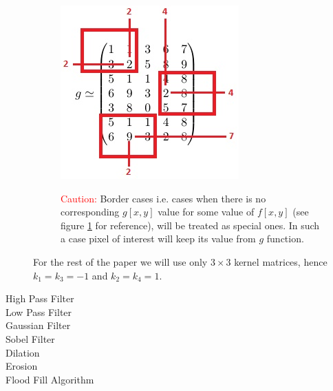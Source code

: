 \documentclass{article}
\begin{document}
\begin{description}
\begin{figure}
\noindent
\begin{minipage}{0.3\textwidth}%
	\includegraphics[width=\linewidth]{_Figures/conv_filter_border.jpg} 
	\caption{}
	\label{fig:caution}
\end{minipage}%
\hfill%
\begin{minipage}{0.6\textwidth}\raggedleft
\textcolor{red}{Caution:} Border cases i.e. cases when there is no corresponding $g[x,y]$ value for some value of $f[x,y]$ (see figure \ref{fig:caution} for reference), will be treated as special ones. In such a case pixel of interest will keep its value from $g$ function.
\end{minipage}
\end{figure}

For the rest of the paper we will use only $3 \times 3$ kernel matrices, hence $k_1 = k_3 = -1$ and $k_2 = k_4 = 1$.

\item[High Pass Filter]
\item[Low Pass Filter]
\item[Gaussian Filter]
\item[Sobel Filter]
\item[Dilation]
\item[Erosion]
\item[Flood Fill Algorithm]
\end{description} 
\end{document}
